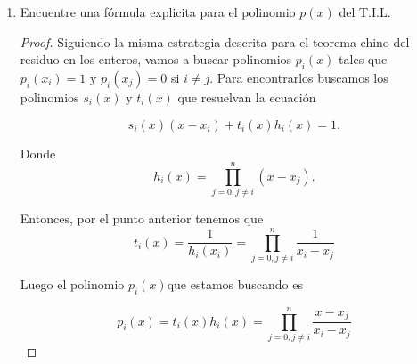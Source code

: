 \documentclass[letter,twoside,12pt]{article}
\begin{document}
\begin{enumerate}[label=\textbf{(\alph*)}]
\begin{proof}
Con $ q(x) $ y $ r(x) $ \'unicos y deg$(r(x))<$deg$(x-x_0)=1$. Por lo tanto $r(x)$ solo puede ser una constante. Adem\'as $r$ denotada de esta manera porque es una constante no puede ser igual a la constante 0, pues esto implicaria que $h_0(x)$ ser\'ia divisible por $x-x_0$, es decir que al evaluar en $x_0$, tendriamos que $h_0(x_0)=0$ que contradice nuestra suposici\'on.

Pero aun m\'as, si reducimos m\'odulo $\langle x - x_0 \rangle$ tenemos que $h_0 \equiv r $ mod $\langle x - x_0 \rangle$. Por el punto tenemos que esto es equivalente a que $r=h_0(x_0)$.

Finalmente dividimos la ecuaci\'on (1) a lado y lado por $h_0(x_0)$ y obtenemos

\begin{equation}
\frac{h_0(x)}{h_0(x_0)}=\frac{q(x)}{h_0(x_0)}(x-x_0)+1 \nonumber
\end{equation}
y despejando el 1 obtenemos
\begin{equation}
-\frac{q(x)}{h_0(x_0)}(x-x_0)+\frac{h_0(x)}{h_0(x_0)}=+1 \nonumber
\end{equation}

Luego $s_0(x) = -q(x)/h_0(x_0)$ y $t_0(x)=1/h_0(x_0)$.
\end{proof}
\item Encuentre una f\'ormula explicita para el polinomio $p(x)$ del T.I.L.
\begin{proof}

Siguiendo la misma estrategia descrita para el teorema chino del residuo en los enteros, vamos a buscar polinomios $p_i(x)$ tales que $p_i(x_i)=1$ y $p_i(x_j)=0$ si $i\not = j$.
Para encontrarlos buscamos los polinomios $s_i(x)$ y $t_i(x)$ que resuelvan la ecuaci\'on

\begin{equation}
s_i(x)(x-x_i)+t_i(x)h_i(x)=1. \nonumber
\end{equation}

Donde 
\begin{equation}
h_i(x)=\prod_{j=0,j\not=i}^{n} (x-x_j). \nonumber
\end{equation}

Entonces, por el punto anterior tenemos que 
\begin{equation}
t_i(x)=\frac{1}{h_i(x_i)}=\prod_{j=0,j\not=i}^{n} \frac{1}{x_i-x_j} \nonumber
\end{equation}

Luego el polinomio $p_i(x)$que estamos buscando es

\begin{equation}
p_i(x)=t_i(x)h_i(x)=\prod_{j=0,j\not=i}^{n} \frac{x-x_j}{x_i-x_j} \nonumber
\end{equation}


\end{proof}
\end{enumerate}
\end{document}
